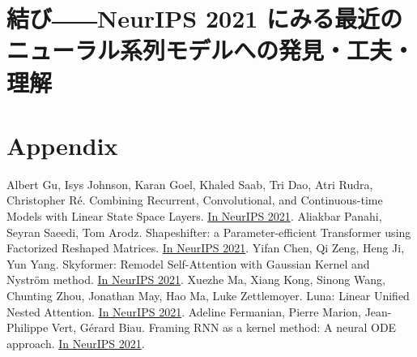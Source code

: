 \documentclass[b5paper,xelatex,ja=standard,10pt]{bxjsarticle}
\begin{document}
\section*{結び――NeurIPS 2021 にみる最近のニューラル系列モデルへの発見・工夫・理解}


\section*{Appendix}


\begin{thebibliography}{99}
     Albert Gu, Isys Johnson, Karan Goel, Khaled Saab, Tri Dao, Atri Rudra, Christopher Ré. Combining Recurrent, Convolutional, and Continuous-time Models with Linear State Space Layers. {\href{https://proceedings.neurips.cc/paper/2021/hash/05546b0e38ab9175cd905eebcc6ebb76-Abstract.html}{In NeurIPS 2021}}.
     Aliakbar Panahi, Seyran Saeedi, Tom Arodz. Shapeshifter: a Parameter-efficient Transformer using Factorized Reshaped Matrices. {\href{https://proceedings.neurips.cc/paper/2021/hash/09def3ebbc44ff3426b28fcd88c83554-Abstract.html}{In NeurIPS 2021}}.
     Yifan Chen, Qi Zeng, Heng Ji, Yun Yang. Skyformer: Remodel Self-Attention with Gaussian Kernel and Nyström method. {\href{https://proceedings.neurips.cc/paper/2021/hash/10a7cdd970fe135cf4f7bb55c0e3b59f-Abstract.html}{In NeurIPS 2021}}.
     Xuezhe Ma, Xiang Kong, Sinong Wang, Chunting Zhou, Jonathan May, Hao Ma, Luke Zettlemoyer. Luna: Linear Unified Nested Attention. {\href{https://proceedings.neurips.cc/paper/2021/hash/14319d9cfc6123106878dc20b94fbaf3-Abstract.html}{In NeurIPS 2021}}.
     Adeline Fermanian, Pierre Marion, Jean-Philippe Vert, Gérard Biau. Framing RNN as a kernel method: A neural ODE approach. {\href{https://proceedings.neurips.cc/paper/2021/hash/18a9042b3fc5b02fe3d57fea87d6992f-Abstract.html}{In NeurIPS 2021}}.


\end{thebibliography}
\end{document}
